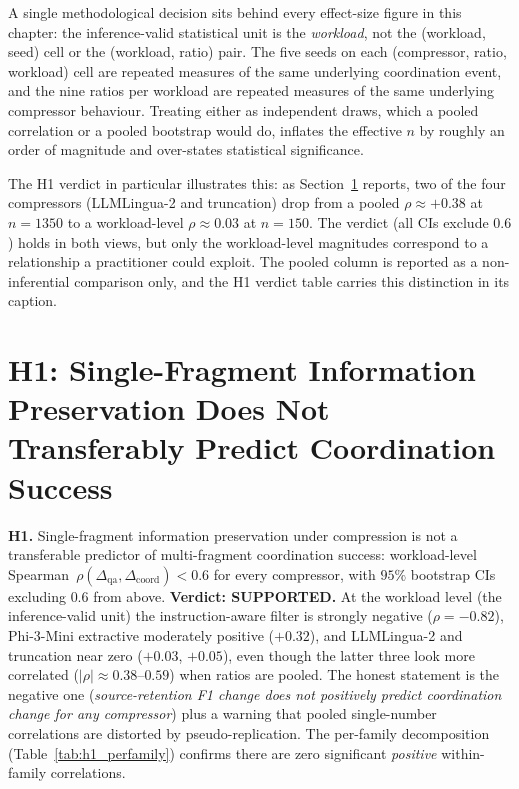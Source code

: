 A single methodological decision sits behind every effect-size
figure in this chapter: the inference-valid statistical unit is
the \emph{workload}, not the (workload, seed) cell or the
(workload, ratio) pair. The five seeds
on each (compressor, ratio, workload) cell are repeated measures
of the same underlying coordination event, and the nine ratios per
workload are repeated measures of the same underlying compressor
behaviour. Treating either as independent draws, which a pooled
correlation or a pooled bootstrap would do, inflates the
effective $n$ by roughly an order of magnitude and over-states
statistical significance.

The H1 verdict in particular illustrates this: as
Section~\ref{sec:h1} reports, two of the four compressors
(LLMLingua-2 and truncation) drop from a pooled
$\rho \approx +0.38$ at $n = 1350$ to a workload-level
$\rho \approx 0.03$ at $n = 150$. The verdict (all CIs exclude
$0.6$) holds in both views, but only the workload-level magnitudes
correspond to a relationship a practitioner could exploit. The
pooled column is reported as a non-inferential comparison only,
and the H1 verdict table carries this distinction in its caption.

\section{H1: Single-Fragment Information Preservation Does Not Transferably Predict Coordination Success}
\label{sec:h1}

\begin{tcolorbox}[colback=black!4, colframe=black!50, sharp corners,
                  boxrule=0.4pt, boxsep=2pt, left=4pt, right=4pt,
                  top=2pt, bottom=2pt]
\textbf{H1.} Single-fragment information preservation under
compression is not a transferable predictor of multi-fragment
coordination success: workload-level
Spearman~$\rho(\Delta_\text{qa}, \Delta_\text{coord}) < 0.6$ for
every compressor, with $95\%$ bootstrap CIs excluding $0.6$ from
above. \textbf{Verdict: SUPPORTED.} At the workload level (the
inference-valid unit) the instruction-aware filter is strongly
negative ($\rho=-0.82$), Phi-3-Mini extractive moderately positive
($+0.32$), and LLMLingua-2 and truncation near zero ($+0.03$,
$+0.05$), even though the latter three look more correlated
($|\rho|\approx0.38$--$0.59$) when ratios are pooled. The honest
statement is the negative one (\emph{source-retention F1 change does
not positively predict coordination change for any compressor}) plus
a warning that pooled single-number correlations are distorted by
pseudo-replication. The per-family decomposition
(Table~\ref{tab:h1_perfamily}) confirms there are zero significant
\emph{positive} within-family correlations.
\end{tcolorbox}

